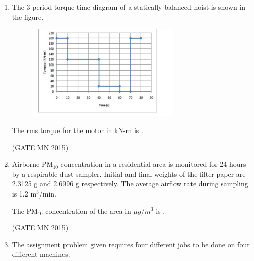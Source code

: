 \documentclass[journal]{IEEEtran}
\begin{document}
\begin{enumerate}
The corner point feasible solution in terms of $(x_1,x_2)$ is  


\hfill(GATE MN 2015)
\begin{multicols}{4}
\begin{enumerate}
\item (1.5, 0)  
\item (1.25, 1.5)  
\item (0.5, 1.0)  
\item (2.25, 1.5)  
\end{enumerate}
\end{multicols}


\item The 3-period torque-time diagram of a statically balanced hoist is shown in the figure.
\begin{figure}[H]                    
\centering          
\includegraphics[width=0.7\textwidth]{Screenshot_2025_0818_083612.png}  
\caption{}   
\label{fig:Q53}
\end{figure}

The rms torque for the motor in kN-m is \underline{\hspace{2cm}}.

\hfill(GATE MN 2015)

\item Airborne PM$_{10}$ concentration in a residential area is monitored for 24 hours by a respirable dust sampler.  
Initial and final weights of the filter paper are 2.3125 g and 2.6996 g respectively.  
The average airflow rate during sampling is 1.2 m$^3$/min.  

The PM$_{10}$ concentration of the area in $\mu g/m^3$ is \underline{\hspace{2cm}}.  

\hfill(GATE MN 2015)


\item The assignment problem given requires four different jobs to be done on four different machines.  



\end{enumerate}
\end{document}

